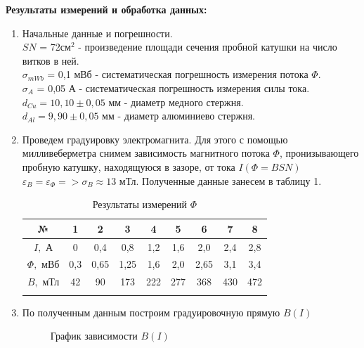 \documentclass[a4paper, 12pt]{article}%
\begin{document}
	\textbf{Результаты измерений и обработка данных: }\\
	\begin{enumerate}
	
	\item Начальные данные и погрешности.\\
	$SN$ = 72см$^2$ - произведение площади сечения пробной катушки на число
	витков в ней.\\
	$\sigma_{mWb}$ = 0,1 мВб - систематическая погрешность измерения потока $\Phi$.\\
	$\sigma_{A}$ = 0,05 А - систематическая погрешность измерения силы тока.\\
	$d_{Cu} = 10,10 \pm 0,05$ мм - диаметр медного стержня.\\
	$d_{Al} = 9,90 \pm 0,05$ мм - диаметр алюминиево стержня.\\
	
	\item Проведем градуировку электромагнита. Для этого с помощью милливеберметра снимем зависимость магнитного потока $\Phi$, пронизывающего пробную катушку, находящуюся в зазоре, от тока $I (\Phi = BSN)$ $\varepsilon_B = \varepsilon_\Phi => \sigma_B \approx 13$ мТл. Полученные данные занесем в таблицу 1.
	
	\begin{longtable} {|c|c|c|c|c|c|c|c|c|}
		\hline
		№ & 1 & 2 & 3 & 4 & 5 & 6 & 7 & 8 \\ \hline 
		$I, $ А & 0 & 0,4 & 0,8 & 1,2 & 1,6 & 2,0 & 2,4 & 2,8 \\ \hline
		$\Phi, $ мВб & 0,3 & 0,65 & 1,25 & 1,6 & 2,0 & 2,65 & 3,1 & 3,4 \\ \hline
		$B, $ мТл & 42 & 90 & 173 & 222 & 277 & 368 & 430 & 472 \\ \hline
	\caption{Результаты измерений $\Phi$}
	\end{longtable}
	
	\item По полученным данным построим градуировочную прямую $B(I)$
	
	\begin{figure}[h]
		\caption{График зависимости $B(I)$}
	\end{figure}
	

\end{enumerate}
\end{document}
